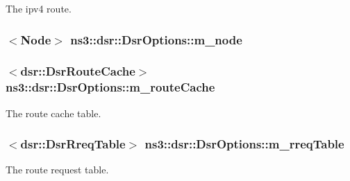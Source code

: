 The ipv4 route. 

\subsubsection[{\texorpdfstring{m\+\_\+node}{m_node}}]{$<${\bf Node}$>$ ns3\+::dsr\+::\+Dsr\+Options\+::m\+\_\+node\hspace{0.3cm}{\ttfamily [private]}}\hypertarget{classns3_1_1dsr_1_1DsrOptions_afbf28d4fe766b82db848b03c986b6584}{}\label{classns3_1_1dsr_1_1DsrOptions_afbf28d4fe766b82db848b03c986b6584}
\subsubsection[{\texorpdfstring{m\+\_\+route\+Cache}{m_routeCache}}]{$<${\bf dsr\+::\+Dsr\+Route\+Cache}$>$ ns3\+::dsr\+::\+Dsr\+Options\+::m\+\_\+route\+Cache\hspace{0.3cm}{\ttfamily [protected]}}\hypertarget{classns3_1_1dsr_1_1DsrOptions_acc253711c35926e48590e46125646a1b}{}\label{classns3_1_1dsr_1_1DsrOptions_acc253711c35926e48590e46125646a1b}


The route cache table. 

\subsubsection[{\texorpdfstring{m\+\_\+rreq\+Table}{m_rreqTable}}]{$<${\bf dsr\+::\+Dsr\+Rreq\+Table}$>$ ns3\+::dsr\+::\+Dsr\+Options\+::m\+\_\+rreq\+Table\hspace{0.3cm}{\ttfamily [protected]}}\hypertarget{classns3_1_1dsr_1_1DsrOptions_a386c046f3ea515e6c577f02b3378c2a7}{}\label{classns3_1_1dsr_1_1DsrOptions_a386c046f3ea515e6c577f02b3378c2a7}


The route request table. 

